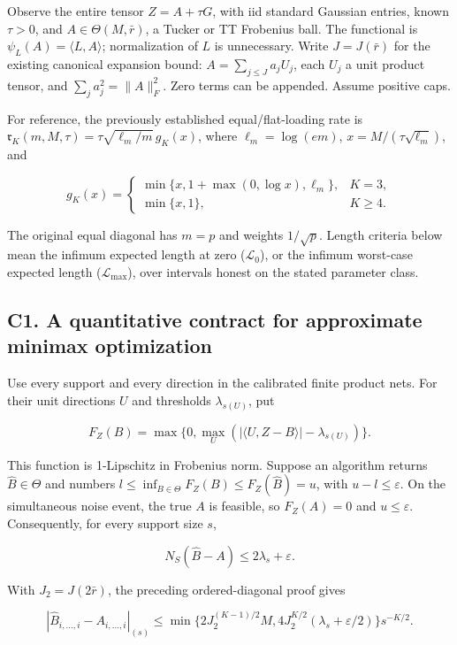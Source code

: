 Observe the entire tensor \(Z=A+\tau G\), with iid standard Gaussian
entries, known \(\tau>0\), and \(A\in\Theta(M,\bar r)\), a Tucker or TT
Frobenius ball. The functional is \(\psi_L(A)=\langle L,A\rangle\);
normalization of \(L\) is unnecessary. Write \(J=J(\bar r)\) for the
existing canonical expansion bound: \(A=\sum_{j\le J}a_j U_j\), each
\(U_j\) a unit product tensor, and \(\sum_j a_j^2=\|A\|_F^2\). Zero
terms can be appended. Assume positive caps.

For reference, the previously established equal/flat-loading rate is
\(\mathfrak r_K(m,M,\tau)=\tau\sqrt{\ell_m/m}\,g_K(x)\), where
\(\ell_m=\log(em)\), \(x=M/(\tau\sqrt{\ell_m})\), and

\[g_K(x)=\begin{cases}
\min\{x,1+\max(0,\log x),\ell_m\},&K=3,\\
\min\{x,1\},&K\ge4.
\end{cases}\]

The original equal diagonal has \(m=p\) and weights \(1/\sqrt p\).
Length criteria below mean the infimum expected length at zero
(\(\mathcal L_0\)), or the infimum worst-case expected length
(\(\mathcal L_{\max}\)), over intervals honest on the stated parameter
class.

\subsection{C1. A quantitative contract for approximate minimax
optimization}\label{c1.-a-quantitative-contract-for-approximate-minimax-optimization}\label{sup:C1}

Use every support and every direction in the calibrated finite product
nets. For their unit directions \(U\) and thresholds \(\lambda_{s(U)}\),
put

\[F_Z(B)=\max\{0,\max_U(|\langle U,Z-B\rangle|-\lambda_{s(U)})\}.\]

This function is 1-Lipschitz in Frobenius norm. Suppose an algorithm
returns \(\widehat B\in\Theta\) and numbers
\(l\le\inf_{B\in\Theta}F_Z(B)\le
F_Z(\widehat B)=u\), with \(u-l\le\varepsilon\). On the simultaneous
noise event, the true \(A\) is feasible, so \(F_Z(A)=0\) and
\(u\le\varepsilon\). Consequently, for every support size \(s\),

\[N_S(\widehat B-A)\le 2\lambda_s+\varepsilon.\]

With \(J_2=J(2\bar r)\), the preceding ordered-diagonal proof gives

\[|\widehat B_{i,\ldots,i}-A_{i,\ldots,i}|_{(s)}
\le \min\{2J_2^{(K-1)/2}M,
4J_2^{K/2}(\lambda_s+\varepsilon/2)\}s^{-K/2}.\]

